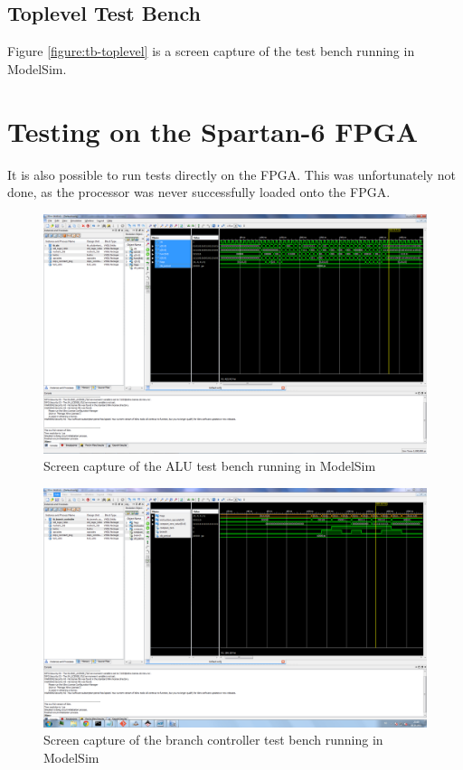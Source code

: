 \subsection{Toplevel Test Bench}



Figure \vref{figure:tb-toplevel} is a screen capture of the test bench running in ModelSim.

\section{Testing on the Spartan-6 FPGA}

It is also possible to run tests directly on the FPGA.
This was unfortunately not done, as the processor was never successfully loaded onto the FPGA.


\begin{figure}
	\begin{center}
		\includegraphics[keepaspectratio, width=\textwidth]{graphics/tb_alu.PNG}
		\caption{Screen capture of the ALU test bench running in ModelSim}
		\label{figure:tb-alu}
	\end{center}
\end{figure}

\begin{figure}
	\begin{center}
		\includegraphics[keepaspectratio, width=\textwidth]{graphics/tb_branch_controller.PNG}
		\caption{Screen capture of the branch controller test bench running in ModelSim}
		\label{figure:tb-branch-controller}
	\end{center}
\end{figure}

